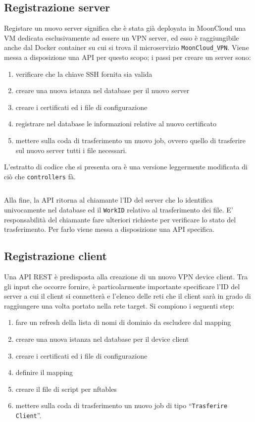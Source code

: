 \subsection{Registrazione server}
Registare un nuovo server significa che è stata già deployata in MoonCloud una VM dedicata
esclusivamente ad essere un VPN server, ed esso è raggiungibile anche dal Docker container su
cui si trova il microservizio \texttt{MoonCloud\_VPN}.
Viene messa a disposizione una API per questo scopo; i passi per creare un server sono:
\begin{enumerate}
    \item verificare che la chiave SSH fornita sia valida
    \item creare una nuova istanza nel database per il nuovo server
    \item creare i certificati ed i file di configurazione
    \item registrare nel database le informazioni relative al nuovo certificato
    \item mettere sulla coda di trasferimento un nuovo job, ovvero quello di
    trasferire sul nuovo server tutti i file necessari.
\end{enumerate}
L'estratto di codice che si presenta ora è una versione leggermente modificata di ciò che
\texttt{controllers} fà.
\inputminted[tabsize=4, breaklines]{python}{code_samples/controllers_create_server.py}

Alla fine, la API ritorna al chiamante l'ID del server che lo identifica univocamente
nel database ed il \texttt{WorkID} relativo al trasferimento dei file. E' responsabilità
del chiamante fare ulteriori richieste per verificare lo stato del trasferimento. Per farlo
viene messa a disposizione una API specifica.

\subsection{Registrazione client}
Una API REST è predisposta alla creazione di un nuovo VPN device client. Tra gli input
che occorre fornire, è particolarmente importante specificare l'ID del server a cui
il client si connetterà e l'elenco delle reti che il client sarà in grado di
raggiungere una volta portato nella rete target.
Si compiono i seguenti step:
\begin{enumerate}
    \item fare un refresh della lista di nomi di dominio da escludere dal mapping
    \item creare una nuova istanza nel database per il device client
    \item creare i certificati ed i file di configurazione
    \item definire il mapping
    \item creare il file di script per nftables
    \item mettere sulla coda di trasferimento un nuovo job di tipo ``\texttt{Trasferire Client}''.
\end{enumerate}

